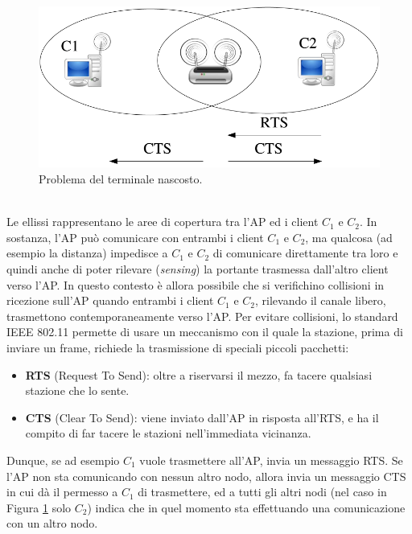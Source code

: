 \begin{figure}[htbp]
	\centering
	\includegraphics[scale = 0.5]{images/hidden-node-problem}
	\caption{Problema del terminale nascosto.}
	\label{img:hidden-node-problem}
\end{figure}\\
Le ellissi rappresentano le aree di copertura tra l'AP ed i client $C_1$ e $C_2$. In sostanza, l'AP può comunicare con entrambi i client $C_1$ e $C_2$, ma qualcosa (ad esempio la distanza) impedisce a $C_1$ e $C_2$ di comunicare direttamente tra loro e quindi anche di poter rilevare (\textit{sensing}) la portante trasmessa dall'altro client verso l'AP. In questo contesto è allora possibile che si verifichino collisioni in ricezione sull'AP quando entrambi i client $C_1$ e $C_2$, rilevando il canale libero, trasmettono contemporaneamente verso l'AP. Per evitare collisioni, lo standard IEEE 802.11 permette di usare un meccanismo con il quale la stazione, prima di inviare un frame, richiede la trasmissione di speciali piccoli pacchetti:
\begin{itemize}
	\item \textbf{RTS} (Request To Send): oltre a riservarsi il mezzo, fa tacere qualsiasi stazione che lo sente.
	\item \textbf{CTS} (Clear To Send): viene inviato dall'AP in risposta all'RTS, e ha il compito di far tacere le stazioni nell'immediata vicinanza.
\end{itemize}
Dunque, se ad esempio $C_1$ vuole trasmettere all'AP, invia un messaggio RTS. Se l'AP non sta comunicando con nessun altro nodo, allora invia un messaggio CTS in cui dà il permesso a $C_1$ di trasmettere, ed a tutti gli altri nodi (nel caso in Figura \ref{img:hidden-node-problem} solo $C_2$) indica che in quel momento sta effettuando una comunicazione con un altro nodo.
